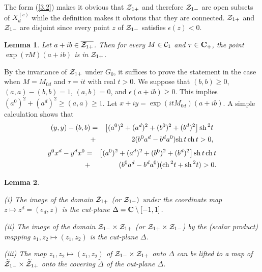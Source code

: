 \documentclass[a4paper,a4paper]{article}
\newtheorem{lemma}{Lemma}[section]
\def\bC{{\bf C}}
\def\ch{{\rm ch\,}}
\def\sh{{\rm sh\,}}
\def\CC{{\cal C}}
\def\ZZ{{\cal Z}}
\def\ovl{\overline}
\def\Xcd{X_d^{(c)}}
\begin{document}
The form (\ref{3.2}) makes it obvious that $\ZZ_{1+}$
and therefore
$\ZZ_{1-}$ are open
subsets of $\Xcd$ while the definition makes it obvious that they are
connected. $\ZZ_{1+}$ and $\ZZ_{1-}$ are disjoint since every point
$z$ of $\ZZ_{1-}$ satisfies $\epsilon(z) < 0$.

\begin{lemma}
\label{z2}
Let $a+ib \in \ovl{\ZZ_{1+}}$.
Then for every $M \in \CC_1$ and $\tau \in \bC_+$,
the point $\exp(\tau M)(a+ib)$ is in $ \ZZ_{1+}$.
\end{lemma}

 By the invariance of $\ZZ_{1+}$ under $G_0$, it suffices
to prove the statement in the case when $M = M_{0d}$ and $\tau = it$ with real
$t > 0$. We suppose that $(b,b)\ge 0$, $(a,a)-(b,b) =1$, $(a,b) =0$, and
$\epsilon(a+ib) \ge 0$. This implies
$(a^0)^2 + (a^d)^2 \ge (a,a) \ge 1$.
Let $x+iy = \exp(it M_{0d})(a+ib)$. A simple calculation shows that
\begin{eqnarray}
(y,y) - (b,b)&=&
\left[(a^0)^2 + (a^d)^2 + (b^0)^2 + (b^d)^2\right]\sh^2 t \nonumber\\
&+&  2(b^0 a^d - b^d a^0)\sh t\, \ch t > 0,
\end{eqnarray}
\begin{eqnarray}
y^0 x^d - y^d x^0 &=&
\left[(a^0)^2 + (a^d)^2 +(b^0)^2 + (b^d)^2\right]\sh t\, \ch t\nonumber\\
&+& (b^0 a^d - b^d a^0)(\ch^2 t + \sh^2 t) >0.
\end{eqnarray}

\vskip15pt

\begin{lemma}
\label{cutplane}
\begin{description}
\item (i) The image of the domain $\ZZ_{1+}$  (or $\ZZ_{1-})$
under the coordinate map $z \mapsto z^d = (e_d,z)$ is the cut-plane
$\Delta = {\bf C} \setminus[-1,1]$.
\item (ii)
The image of the domain $\ZZ_{1-} \times \ZZ_{1+}$ (or $\ZZ_{1+} \times
\ZZ_{1-}$) by the (scalar product)
mapping $z_1,z_2 \mapsto (z_1,z_2)$ is the cut-plane
$\Delta$.
\item (iii)
The map $z_1, z_2 \mapsto (z_1,z_2)$ of $\ZZ_{1-} \times \ZZ_{1+}$
onto $\Delta$ can be lifted to a map of
$\widetilde\ZZ_{1-} \times \widetilde\ZZ_{1+}$ onto
the covering $\widetilde\Delta$ of the cut-plane
$\Delta$.
\end{description}
\end{lemma}
\end{document}
